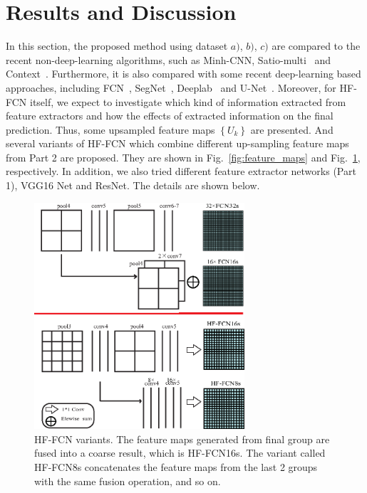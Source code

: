 \section{Results and Discussion}
\label{Sec:Res}

In this section, the proposed method using dataset ${a)}$, ${b)}$, ${c)}$ are compared to the recent non-deep-learning algorithms, such as Minh-CNN\cite{IEEEexample:mnih2013machine}, Satio-multi~\cite{IEEEexample:saito2016multiple} and Context~\cite{IEEEexample:audebert2017deep}.
%
Furthermore, it is also compared with some recent deep-learning based approaches, including FCN~\cite{IEEEexample:Long_2015_CVPR}, SegNet~\cite{IEEEexample:badrinarayanan2017segnet}, Deeplab~\cite{IEEEexample:chen2016deeplab} and U-Net~\cite{IEEEexample:ronneberger2015u}.
Moreover, for HF-FCN itself, we expect to investigate which kind of information extracted from feature extractors and how the effects of extracted information on the final prediction.
Thus, some upsampled feature maps ${\left\{U_k\right\}}$ are presented.
And several variants of HF-FCN which combine different up-sampling feature maps from Part 2 are proposed.
They are shown in Fig.~\ref{fig:feature_maps} and Fig.~\ref{fig:Variants}, respectively.
In addition, we also tried different feature extractor networks (Part 1), VGG16 Net and ResNet. The details are shown below.

\begin{figure}[t]
\begin{center}
\includegraphics[width=7.8cm]{Figures/vairants.eps}
\caption{HF-FCN variants. The feature maps generated from final group are fused into a coarse result, which is HF-FCN16s. The variant called HF-FCN8s concatenates the feature maps from the last 2 groups with the same fusion operation, and so on.}
\label{fig:Variants}
\end{center}
\end{figure}

